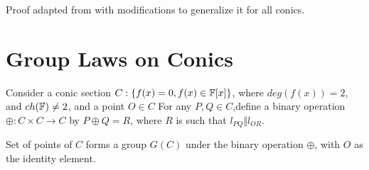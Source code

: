 \begin{remark}
  Proof adapted from \cite{brannan} with modifications to generalize it for all conics.
\end{remark}

\section{Group Laws on Conics}

Consider a conic section $C: \{f(x)=0, f(x)\in \mathbb{F}[x]\}$, where $deg(f(x))=2$, and $ch(\mathbb{F})\ne 2$,
and a point $O \in C$ For any $P,Q \in C$,define a binary operation
$\oplus :C \times C \rightarrow C$ by $P \oplus Q = R$, where $R$ is such that
$l_{PQ} \Vert l_{OR}$.

\begin{theorem}
  Set of points of $C$ forms a group $G(C)$ under the binary operation $\oplus$, with $O$ as the
  identity element.
\end{theorem}

